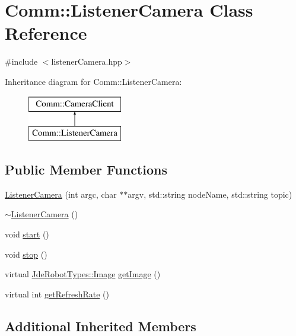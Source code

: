 \hypertarget{class_comm_1_1_listener_camera}{}\section{Comm\+:\+:Listener\+Camera Class Reference}
\label{class_comm_1_1_listener_camera}


{\ttfamily \#include $<$listener\+Camera.\+hpp$>$}

Inheritance diagram for Comm\+:\+:Listener\+Camera\+:\begin{figure}[H]
\begin{center}
\leavevmode
\includegraphics[height=2.000000cm]{class_comm_1_1_listener_camera}
\end{center}
\end{figure}
\subsection*{Public Member Functions}
\begin{DoxyCompactItemize}
\item 
\hyperlink{class_comm_1_1_listener_camera_ab798ec9f70324e0b644edf14bfca443a}{Listener\+Camera} (int argc, char $\ast$$\ast$argv, std\+::string node\+Name, std\+::string topic)
\item 
\hyperlink{class_comm_1_1_listener_camera_a7408151b2672fdf293226767b34f4992}{$\sim$\+Listener\+Camera} ()
\item 
void \hyperlink{class_comm_1_1_listener_camera_afc4172a88e4f187bce8f809f91db7f0f}{start} ()
\item 
void \hyperlink{class_comm_1_1_listener_camera_a62683e72d06ba387aa19e4f213d1eada}{stop} ()
\item 
virtual \hyperlink{class_jde_robot_types_1_1_image}{Jde\+Robot\+Types\+::\+Image} \hyperlink{class_comm_1_1_listener_camera_a854d67843d55c98a0020661b8fb7fca9}{get\+Image} ()
\item 
virtual int \hyperlink{class_comm_1_1_listener_camera_a7ba9f0f4210d75cbedba5a016ac60175}{get\+Refresh\+Rate} ()
\end{DoxyCompactItemize}
\subsection*{Additional Inherited Members}


